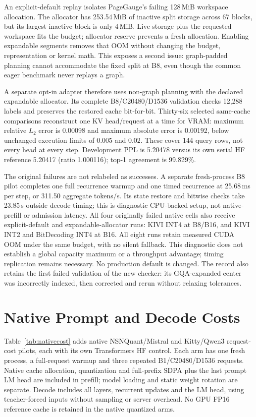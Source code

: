 \documentclass{article}
\begin{document}
An explicit-default replay isolates PageGauge's failing 128\,MiB workspace
allocation. The allocator has 253.54\,MiB of inactive split storage across 67
blocks, but its largest inactive block is only 4\,MiB. Live storage plus the
requested workspace fits the budget; allocator reserve prevents a fresh
allocation. Enabling expandable segments removes that OOM without changing
the budget, representation or kernel math. This exposes a second issue:
graph-padded planning cannot accommodate the fixed split at B8, even though
the common eager benchmark never replays a graph.

A separate opt-in adapter therefore uses non-graph planning with the declared
expandable allocator. Its complete B8/C20480/D1536 validation checks 12,288
labels and preserves the restored cache bit-for-bit. Thirty-six selected
same-cache comparisons reconstruct one KV head/request at a time for VRAM:
maximum relative $L_2$ error is 0.00098 and maximum absolute error is 0.00192,
below unchanged execution limits of 0.005 and 0.02. These cover 144 query rows,
not every head at every step. Development PPL is 5.20478 versus its own serial
HF reference 5.20417 (ratio 1.000116); top-1 agreement is 99.829\%.

The original failures are not relabeled as successes. A separate fresh-process
B8 pilot completes one full recurrence warmup and one timed recurrence at
25.68\,ms per step, or 311.50 aggregate tokens/s. Its state restore and bitwise
checks take 23.85\,s outside decode timing; this is diagnostic CPU-backed setup,
not native-prefill or admission latency. All four originally failed native
cells also receive explicit-default and expandable-allocator runs: KIVI INT4
at B8/B16, and KIVI INT2 and BitDecoding INT4 at B16. All eight runs retain
measured CUDA OOM under the same budget, with no silent fallback. This
diagnostic does not establish a global capacity maximum or a throughput
advantage; timing replication remains necessary. No production default is
changed. The record also retains the
first failed validation of the new checker: its GQA-expanded center was
incorrectly indexed, then corrected and rerun without relaxing tolerances.



\section{Native Prompt and Decode Costs}
Table~\ref{tab:nativecost} adds native NSNQuant/Mistral and Kitty/Qwen3
request-cost pilots, each with its own Transformers HF control. Each arm has
one fresh process, a full-request warmup and three repeated B1/C20480/D1536
requests. Native cache allocation, quantization and full-prefix SDPA plus the
last prompt LM head are included in prefill; model loading and static weight
rotation are separate. Decode includes all layers, recurrent updates and the
LM head, using teacher-forced inputs without sampling or server overhead.
No GPU FP16 reference cache is retained in the native quantized arms.
\end{document}
